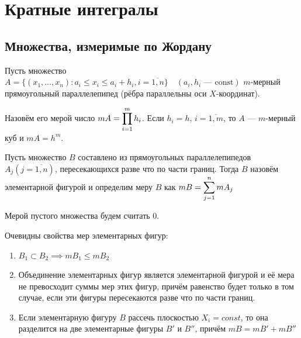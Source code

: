 \section{Кратные интегралы}

\subsection{Множества, измеримые по Жордану}

\begin{definition}
    Пусть множество 
    $A = \{ (x_1, \dots, x_n): a_i \leq x_i \leq a_i + h_i, i = \overline{1, n} \}
    \quad (a_i, h_i \text{ --- const})$ $m$-мерный прямоугольный параллелепипед
    (рёбра параллельны оси $X$-координат).

    Назовём его мерой число $mA = \displaystyle\prod_{i = 1}^m h_i$.
    Если $h_i = h, \, i = \overline{1, m}$, то $A$ --- 
    $m$-мерный куб и $mA = h^m$.
\end{definition}

\begin{definition}
    Пусть множество $B$ составлено из прямоугольных параллелепипедов
    $A_j (j = \overline{1, n})$, пересекающихся разве что по части границ.
    Тогда $B$ назовём элементарной фигурой и определим меру $B$ как 
    $mB = \displaystyle\sum_{j = 1}^n m A_j$

    Мерой пустого множества будем считать 0.
\end{definition}

\begin{remark}
    Очевидны свойства мер элементарных фигур:

    \begin{enumerate}
        \item $B_1 \subset B_2 \implies mB_1 \leq mB_2$
        \item
            Объединение элементарных фигур является элементарной фигурой и её
            мера не превосходит суммы мер этих фигур, причём равенство будет
            только в том случае, если эти фигуры пересекаются разве что по
            части границ.
        \item
            Если элементарную фигуру $B$ рассечь плоскостью $X_i = const$, то
            она разделится на две элементарные фигуры $B'$ и $B''$, причём
            $mB = mB' + mB''$
    \end{enumerate}
\end{remark}

